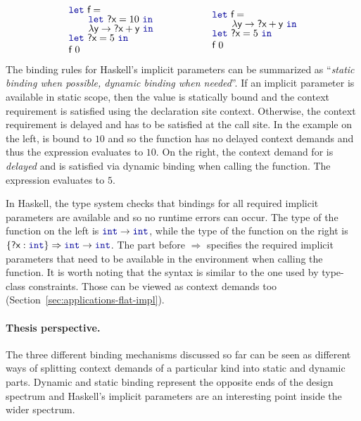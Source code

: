 \begin{equation*}
\begin{array}{l}
\kvd{let}~\ident{f}=\\[-0.25em]
\qquad\kvd{let}~\ident{?x}=10~\kvd{in}\\[-0.25em]
\qquad\lambda \ident{y}\rightarrow \ident{?x}+\ident{y}~\kvd{in}\\[-0.25em]
\kvd{let}~\ident{?x}=5~\kvd{in}\\
\ident{f}~0
\end{array}\hspace{5em}\begin{array}{l}
\kvd{let}~\ident{f}=\\[-0.25em]
\qquad\lambda \ident{y}\rightarrow \ident{?x}+\ident{y}~\kvd{in}\\[-0.25em]
\kvd{let}~\ident{?x}=5~\kvd{in}\\
\ident{f}~0
\end{array}
\end{equation*}
%
The binding rules for Haskell's implicit parameters can be summarized as ``\emph{static binding when possible,
dynamic binding when needed}''. If an implicit parameter is available in static scope, then the value
is statically bound and the context requirement is satisfied using the declaration site context.
Otherwise, the context requirement is delayed and has to be satisfied at the call site.
In the example on the left,  is bound to $10$ and so the function  has no
delayed context demands and thus the expression evaluates to $10$. On the right,
the context demand for  is \emph{delayed} and is satisfied via dynamic binding when calling
the function. The expression evaluates to $5$.

In Haskell, the type system checks that bindings for all required implicit parameters are
available and so no runtime errors can occur. The type of the function  on the left is
$\kvd{int}\rightarrow\kvd{int}$, while the type of the  function on the right is
$\{\ident{?x}:\kvd{int}\}\Rightarrow\kvd{int}\rightarrow\kvd{int}$.
The part before $\Rightarrow$ specifies the required implicit parameters that need to be available
in the environment when calling the function. It is worth noting that the syntax is similar to the
one used by type-class constraints. Those can be viewed as context demands too
(Section~\ref{sec:applications-flat-impl}).

\paragraph{Thesis perspective.}
The three different binding mechanisms discussed so far can be seen as different ways of splitting
context demands of a particular kind into static and dynamic parts. Dynamic and static binding
represent the opposite ends of the design spectrum and Haskell's implicit parameters are an
interesting point inside the wider spectrum.

